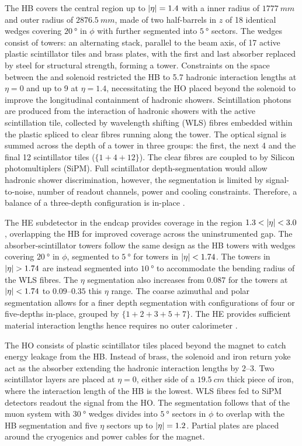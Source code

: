 The HB covers the central region up to $|\eta|=1.4$ with a inner radius of
${\SI{1777}{mm}}$ and outer radius of ${\SI{2876.5}{mm}}$, made of two
half-barrels in $z$ of 18 identical wedges covering ${\SI{20}{\degree}}$ in
$\phi$ with further segmented into  ${\SI{5}{\degree}}$ sectors. The wedges
consist of towers: an alternating stack, parallel to the beam axis, of 17
active plastic scintillator tiles and brass plates, with the first and last
absorber replaced by steel for structural strength, forming a tower.
Constraints on the space  between the \ECAL and solenoid restricted the HB to
5.7 hadronic interaction lengths at ${\eta=0}$ and up to 9 at ${\eta=1.4}$,
necessitating the HO placed beyond the solenoid to improve the longitudinal
containment of hadronic showers. Scintillation photons are produced from the
interaction of hadronic showers with the active scintillation tile, collected
by wavelength shifting (WLS) fibres embedded within the plastic spliced to
clear fibres running along the tower. The optical signal is summed across the
depth of a tower in three groups: the first, the next 4 and the final 12
scintillator tiles (${\{1+4+12\}}$). The clear fibres are coupled to by
Silicon photomultiplers (SiPM). Full scintillator depth-segmentation would
allow hadronic shower discrimination, however, the segmentation is limited by
signal-to-noise, number of readout channels, power and cooling constraints.
Therefore, a balance of a three-depth configuration is in-place
\cite{Mans:1481837}.

The HE subdetector in the endcap provides coverage in the region
${1.3<\aeta<3.0}$, overlapping the HB for improved coverage across the
uninstrumented gap. The absorber-scintillator towers follow the same design as
the HB towers with wedges covering ${\SI{20}{\degree}}$ in $\phi$, segmented
to ${\SI{5}{\degree}}$ for towers in ${|\eta|<1.74}$. The towers in
${\aeta>1.74}$ are instead segmented into ${\SI{10}{\degree}}$ to accommodate
the bending radius of the WLS fibres. The $\eta$ segmentation also increases
from ${0.087}$ for the towers at ${|\eta|<1.74}$ to $0.09$--$0.35$ this $\eta$
range. The coarse azimuthal and polar segmentation allows for a finer depth
segmentation with configurations of four or five-depths in-place, grouped by
${\{1+2+3+5+7\}}$. The HE provides sufficient material interaction lengths
hence requires no outer calorimeter \cite{Mans:1481837}.

The HO consists of plastic scintillator tiles placed beyond the magnet to
catch energy leakage from the HB. Instead of brass, the solenoid and iron
return yoke act as the absorber extending the hadronic interaction lengths by
$2$--$3$. Two scintillator layers are placed at ${\eta=0}$, either side of a
${\SI{19.5}{cm}}$ thick piece of iron, where the interaction length of the HB
is the lowest. WLS fibres fed to SiPM detectors readout the signal from the
HO. The segmentation follows that of the muon system with ${\SI{30}{\degree}}$
wedges divides into ${\SI{5}{\degree}}$ sectors in $\phi$ to overlap with the
HB segmentation and five $\eta$ sectors up to ${|\eta|=1.2}$. Partial plates
are placed around the cryogenics and power cables for the magnet.

